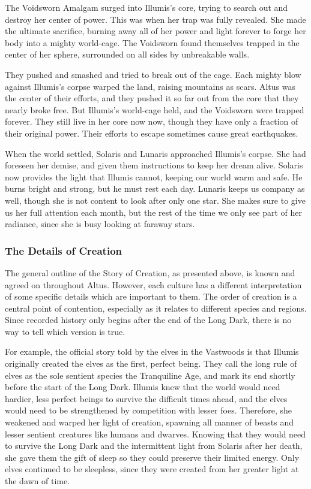     The Voidsworn Amalgam surged into Illumis's core, trying to search out and destroy her center of power.
    This was when her trap was fully revealed.
    She made the ultimate sacrifice, burning away all of her power and light forever to forge her body into a mighty world-cage.
    The Voidsworn found themselves trapped in the center of her sphere, surrounded on all sides by unbreakable walls.

    They pushed and smashed and tried to break out of the cage.
    Each mighty blow against Illumis's corpse warped the land, raising mountains as scars.
    Altus was the center of their efforts, and they pushed it so far out from the core that they nearly broke free.
    But Illumis's world-cage held, and the Voidsworn were trapped forever.
    They still live in her core now now, though they have only a fraction of their original power.
    Their efforts to escape sometimes cause great earthquakes.

    When the world settled, Solaris and Lunaris approached Illumis's corpse.
    She had foreseen her demise, and given them instructions to keep her dream alive.
    Solaris now provides the light that Illumis cannot, keeping our world warm and safe.
    He burns bright and strong, but he must rest each day.
    Lunaris keeps us company as well, though she is not content to look after only one star.
    She makes sure to give us her full attention each month, but the rest of the time we only see part of her radiance, since she is busy looking at faraway stars.

    \subsubsection{The Details of Creation}

      The general outline of the Story of Creation, as presented above, is known and agreed on throughout Altus.
      However, each culture has a different interpretation of some specific details which are important to them.
      The order of creation is a central point of contention, especially as it relates to different species and regions.
      Since recorded history only begins after the end of the Long Dark, there is no way to tell which version is true.

      For example, the official story told by the elves in the Vastwoods is that Illumis originally created the elves as the first, perfect being.
      They call the long rule of elves as the sole sentient species the Tranquiline Age, and mark its end shortly before the start of the Long Dark.
      Illumis knew that the world would need hardier, less perfect beings to survive the difficult times ahead, and the elves would need to be strengthened by competition with lesser foes.
      Therefore, she weakened and warped her light of creation, spawning all manner of beasts and lesser sentient creatures like humans and dwarves.
      Knowing that they would need to survive the Long Dark and the intermittent light from Solaris after her death, she gave them the gift of sleep so they could preserve their limited energy.
      Only elves continued to be sleepless, since they were created from her greater light at the dawn of time.

